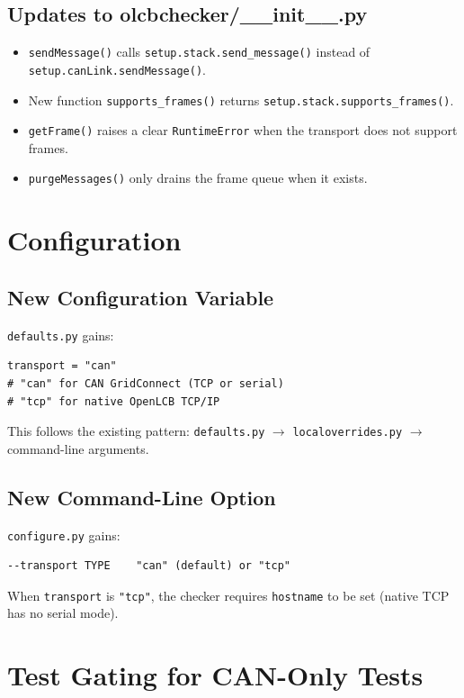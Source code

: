 \subsection{Updates to olcbchecker/\_\_init\_\_.py}

\begin{itemize}
\item \texttt{sendMessage()} calls \texttt{setup.stack.send\_message()} instead
    of \texttt{setup.canLink.sendMessage()}.
\item New function \texttt{supports\_frames()} returns
    \texttt{setup.stack.supports\_frames()}.
\item \texttt{getFrame()} raises a clear \texttt{RuntimeError} when the
    transport does not support frames.
\item \texttt{purgeMessages()} only drains the frame queue when it exists.
\end{itemize}

\section{Configuration}

\subsection{New Configuration Variable}

\texttt{defaults.py} gains:

\begin{verbatim}
transport = "can"
# "can" for CAN GridConnect (TCP or serial)
# "tcp" for native OpenLCB TCP/IP
\end{verbatim}

This follows the existing pattern: \texttt{defaults.py} $\to$
\texttt{localoverrides.py} $\to$ command-line arguments.

\subsection{New Command-Line Option}

\texttt{configure.py} gains:

\begin{verbatim}
--transport TYPE    "can" (default) or "tcp"
\end{verbatim}

When \texttt{transport} is \texttt{"tcp"}, the checker requires
\texttt{hostname} to be set (native TCP has no serial mode).

\section{Test Gating for CAN-Only Tests}

